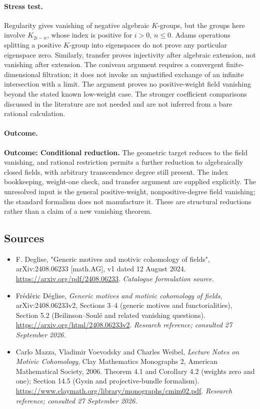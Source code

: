 \documentclass[11pt,a4paper]{article}
\numberwithin{equation}{section}
\begin{document}
\paragraph{Stress test.}
Regularity gives vanishing of negative algebraic $K$-groups, but the groups here involve $K_{2i-n}$, whose index is positive for $i>0$, $n\le0$. Adams operations splitting a positive $K$-group into eigenspaces do not prove any particular eigenspace zero. Similarly, transfer proves injectivity after algebraic extension, not vanishing after extension. The coniveau argument requires a convergent finite-dimensional filtration; it does not invoke an unjustified exchange of an infinite intersection with a limit. The argument proves no positive-weight field vanishing beyond the stated known low-weight case. The stronger coefficient comparisons discussed in the literature are not needed and are not inferred from a bare rational calculation.

\paragraph{Outcome.}
\textbf{Outcome: Conditional reduction.}
The geometric target reduces to the field vanishing, and rational restriction permits a further reduction to algebraically closed fields, with arbitrary transcendence degree still present. The index bookkeeping, weight-one check, and transfer argument are supplied explicitly. The unresolved input is the general positive-weight, nonpositive-degree field vanishing; the standard formalism does not manufacture it. These are structural reductions rather than a claim of a new vanishing theorem.

\subsection{Sources}
\begin{itemize}\raggedright
\item[\textnormal{[S1]}]\hypertarget{source:186:1}{} F. Deglise, "Generic motives and motivic cohomology of fields", arXiv:2408.06233 [math.AG], v1 dated 12 August 2024.
\url{https://arxiv.org/pdf/2408.06233}.
{\small\textit{Catalogue formulation source.}}
\item[\textnormal{[E1]}]\hypertarget{extra:186:1}{} Fr\'ed\'eric D\'eglise, \emph{Generic motives and motivic cohomology of fields}, arXiv:2408.06233v2, Sections 3--4 (generic motives and functorialities), Section 5.2 (Beilinson--Soul\'e and related vanishing questions).
\url{https://arxiv.org/html/2408.06233v2}.
{\small\textit{Research reference; consulted 27 September 2026.}}
\item[\textnormal{[E2]}]\hypertarget{extra:186:2}{} Carlo Mazza, Vladimir Voevodsky and Charles Weibel, \emph{Lecture Notes on Motivic Cohomology}, Clay Mathematics Monographs 2, American Mathematical Society, 2006. Theorem 4.1 and Corollary 4.2 (weights zero and one); Section 14.5 (Gysin and projective-bundle formalism).
\url{https://www.claymath.org/library/monographs/cmim02.pdf}.
{\small\textit{Research reference; consulted 27 September 2026.}}
\end{itemize}
\end{document}

